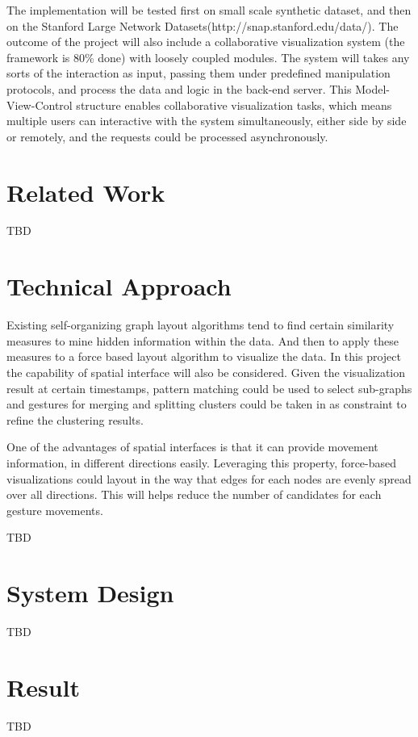 \documentclass{acm_proc_article-sp}
\begin{document}
The implementation will be tested first on small scale synthetic dataset, and then on the Stanford Large Network Datasets(http://snap.stanford.edu/data/). The outcome of the project will also include a collaborative visualization system (the framework is 80\% done) with loosely coupled modules. The system will takes any sorts of the interaction as input, passing them under predefined manipulation protocols, and process the data and logic in the back-end server. This Model-View-Control  structure enables collaborative visualization tasks, which means multiple users can interactive with the system simultaneously, either side by side or remotely, and the requests could be processed asynchronously. 

\section{Related Work}
TBD

\section{Technical Approach}

Existing self-organizing graph layout algorithms tend to find certain similarity measures to mine hidden information within the data. And then to apply these measures to a force based layout algorithm to visualize the data. In this project the capability of spatial interface will also be considered. Given the visualization result at certain timestamps, pattern matching could be used to select sub-graphs and gestures for merging and splitting clusters could be taken in as constraint to refine the clustering results.

One of the advantages of spatial interfaces is that it can provide movement information, in different directions easily. Leveraging this property, force-based visualizations could layout in the way that edges for each nodes are evenly spread over all directions. This will helps reduce the number of candidates for each gesture movements.

TBD

\section{System Design}
TBD

\section{Result}
TBD
\end{document}
